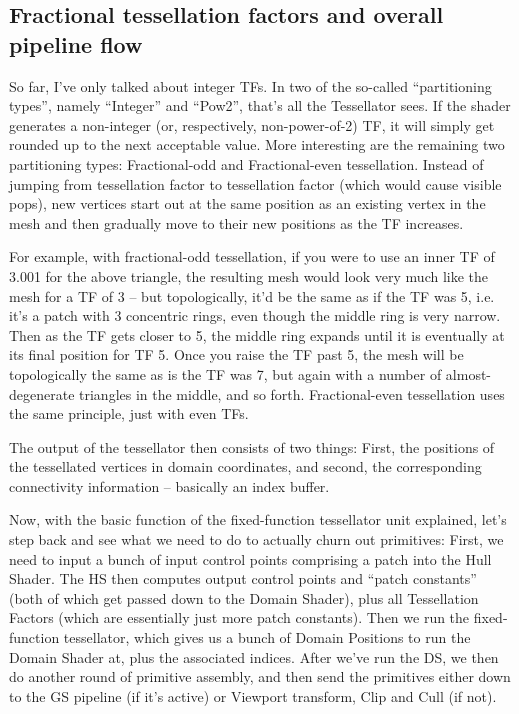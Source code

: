 \documentclass[12pt]{article}
\begin{document}
\subsection{Fractional tessellation factors and overall pipeline flow}
\label{sec:org1161eb4}

So far, I’ve only talked about integer TFs. In two of the so-called “partitioning types”, namely “Integer” and “Pow2”, that’s all the Tessellator sees. If the shader generates a non-integer (or, respectively, non-power-of-2) TF, it will simply get rounded up to the next acceptable value. More interesting are the remaining two partitioning types: Fractional-odd and Fractional-even tessellation. Instead of jumping from tessellation factor to tessellation factor (which would cause visible pops), new vertices start out at the same position as an existing vertex in the mesh and then gradually move to their new positions as the TF increases.

For example, with fractional-odd tessellation, if you were to use an inner TF of 3.001 for the above triangle, the resulting mesh would look very much like the mesh for a TF of 3 – but topologically, it’d be the same as if the TF was 5, i.e. it’s a patch with 3 concentric rings, even though the middle ring is very narrow. Then as the TF gets closer to 5, the middle ring expands until it is eventually at its final position for TF 5. Once you raise the TF past 5, the mesh will be topologically the same as is the TF was 7, but again with a number of almost-degenerate triangles in the middle, and so forth. Fractional-even tessellation uses the same principle, just with even TFs.

The output of the tessellator then consists of two things: First, the positions of the tessellated vertices in domain coordinates, and second, the corresponding connectivity information – basically an index buffer.

Now, with the basic function of the fixed-function tessellator unit explained, let’s step back and see what we need to do to actually churn out primitives: First, we need to input a bunch of input control points comprising a patch into the Hull Shader. The HS then computes output control points and “patch constants” (both of which get passed down to the Domain Shader), plus all Tessellation Factors (which are essentially just more patch constants). Then we run the fixed-function tessellator, which gives us a bunch of Domain Positions to run the Domain Shader at, plus the associated indices. After we’ve run the DS, we then do another round of primitive assembly, and then send the primitives either down to the GS pipeline (if it’s active) or Viewport transform, Clip and Cull (if not).
\end{document}
